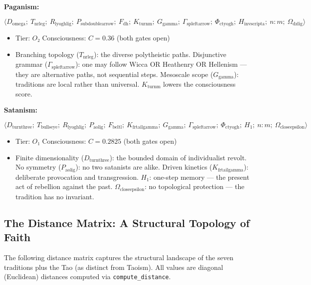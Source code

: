 \documentclass[12pt,a4paper]{article}
\begin{document}
\textbf{Paganism:}


\[\langle D_{\text{omega}};\ T_{\text{nrleg}};\ R_{\text{lyoghlig}};\ P_{\text{subdoublearrow}};\ F_{\text{dh}};\ K_{\text{turnm}};\ G_{\text{gamma}};\ \Gamma_{\text{spleftarrow}};\ \Phi_{\text{ctyogh}};\ H_{\text{invscripta}};\ n{:}m;\ \Omega_{\text{dzlig}} \rangle\]

\begin{itemize}
    \item Tier: $O₂$ \textbar{} Consciousness: $C = 0.36$ (both gates open)
    \item Branching topology ($T_{\text{nrleg}}$): the diverse polytheistic paths. Disjunctive grammar ($\Gamma_{\text{spleftarrow}}$): one may follow Wicca OR Heathenry OR Hellenism --- they are alternative paths, not sequential steps. Mesoscale scope ($G_{\text{gamma}}$): traditions are local rather than universal. $K_{\text{turnm}}$ lowers the consciousness score.
\end{itemize}

\textbf{Satanism:}


\[\langle D_{\text{turnthree}};\ T_{\text{bullseye}};\ R_{\text{lyoghlig}};\ P_{\text{aolig}};\ F_{\text{beltl}};\ K_{\text{frtailgamma}};\ G_{\text{gamma}};\ \Gamma_{\text{spleftarrow}};\ \Phi_{\text{ctyogh}};\ H_1;\ n{:}m;\ \Omega_{\text{closeepsilon}} \rangle\]

\begin{itemize}
    \item Tier: $O₁$ \textbar{} Consciousness: $C = 0.2825$ (both gates open)
    \item Finite dimensionality ($D_{\text{turnthree}}$): the bounded domain of individualist revolt. No symmetry ($P_{\text{aolig}}$): no two satanists are alike. Driven kinetics ($K_{\text{frtailgamma}}$): deliberate provocation and transgression. $H_1$: one-step memory --- the present act of rebellion against the past. $\Omega_{\text{closeepsilon}}$: no topological protection --- the tradition has no invariant.
\end{itemize}

\subsection{The Distance Matrix: A Structural Topology of Faith}

The following distance matrix captures the structural landscape of the seven traditions plus the Tao (as distinct from Taoism). All values are diagonal (Euclidean) distances computed via \texttt{compute\_distance}.
\end{document}
